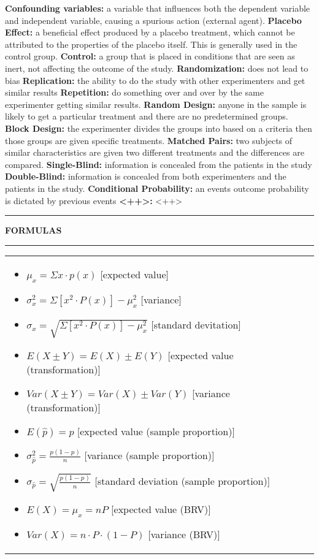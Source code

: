 \documentclass[6pt]{article}
\newcommand{\HL}{\par\noindent\rule{\textwidth}{0.4pt}}
\begin{document}
\begin{footnotesize}
\textbf{Confounding variables:} a variable that influences both the dependent variable and independent variable, causing a spurious action (external agent).
\textbf{Placebo Effect:} a beneficial effect produced by a placebo treatment, which cannot be attributed to the properties of the placebo itself. This is generally used in the control group.
\textbf{Control:} a group that is placed in conditions that are seen as inert, not affecting the outcome of the study.
\textbf{Randomization:} does not lead to bias
\textbf{Replication:} the ability to do the study with other experimenters and get similar results
\textbf{Repetition:} do something over and over by the same experimenter getting similar results.
\textbf{Random Design:} anyone in the sample is likely to get a particular treatment and there are no predetermined groups.
\textbf{Block Design:} the experimenter divides the groups into based on a criteria then those groups are given specific treatments.
\textbf{Matched Pairs:} two subjects of similar characteristics are given two different treatments and the differences are compared.
\textbf{Single-Blind:} information is concealed from the patients in the study
\textbf{Double-Blind:} information is  concealed from both experimenters and the patients in the study.
\textbf{Conditional Probability:} an events outcome probability is dictated by previous events
\textbf{<++>:} <++>

\HL

\begin{flushleft}
\textbf{FORMULAS}
\end{flushleft}

\HL


\begin{tabular}{l | l}

\parbox{0.5\textwidth}{

\begin{itemize}

\item $\mu_{x} = \Sigma x \cdot p(x)$ [expected value]
\item $\sigma^{2}_{x} = \Sigma [x^{2} \cdot P(x)] - \mu^{2}_{x}$ [variance]
\item $\sigma_{x} = \sqrt{\Sigma [x^{2} \cdot P(x)] - \mu^{2}_{x}}$ [standard devitation]
\item $E(X \pm Y) = E(X) \pm E(Y)$ [expected value (transformation)]
\item $Var(X \pm Y) = Var(X) \pm Var(Y)$ [variance (transformation)]
\item $E(\hat{p}) = p$ [expected value (sample proportion)]
\item $\sigma_{\hat{p}}^2 = \frac{p(1-p)}{n}$ [variance (sample proportion)]
\item $\sigma_{\hat{p}} = \sqrt{\frac{p(1-p)}{n}}$ [standard deviation (sample proportion)]
\item $E(X) = \mu_{x} = nP$ [expected value (BRV)]
\item $Var(X) = n \cdot P \cdot (1-P)$ [variance (BRV)]
\end{itemize}

}
\end{tabular}
\end{footnotesize}
\end{document}
